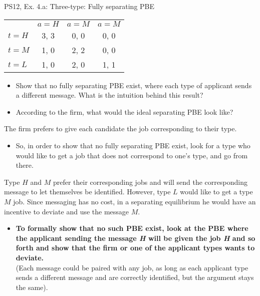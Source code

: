 \begin{frame}{PS12, Ex. 4.a: Three-type: Fully separating PBE}
    \begin{table}
      \begin{tabular}{l|c|c|c|}
          \multicolumn{1}{c}{} & \multicolumn{1}{c}{$a=H$} & \multicolumn{1}{c}{$a=M$} & \multicolumn{1}{c}{$a=M$} \\\cline{2-4}
          $t=H$ & 3, 3 & 0, 0 & 0, 0 \\\cline{2-4}
          $t=M$ & 1, 0 & 2, 2 & 0, 0 \\\cline{2-4}
          $t=L$ & 1, 0 & 2, 0 & 1, 1 \\\cline{2-4}
      \end{tabular}
    \end{table}\vspace{-8pt}
    \begin{itemize}
      \item[(a)] Show that no fully separating PBE exist, where each type of applicant sends a different message. What is the intuition behind this result?
      \item[Step 1:] According to the firm, what would the ideal separating PBE look like?
    \end{itemize}\vspace{-6pt}
    The firm prefers to give each candidate the job corresponding to their type.\vspace{-4pt}
    \begin{itemize}
      \item[Step 2:] So, in order to show that no fully separating PBE exist, look for a type who would like to get a job that does not correspond to one's type, and go from there.
    \end{itemize}\vspace{-6pt}
    Type $H$ and $M$ prefer their corresponding jobs and will send the corresponding message to let themselves be identified. However, type $L$ would like to get a type $M$ job. Since messaging has no cost, in a separating equilibrium he would have an incentive to deviate and use the message $M$.\vspace{-4pt}
    \begin{itemize}
      \item[Step 3:] \textbf{To formally show that no such PBE exist, look at the PBE where the applicant sending the message \textit{H} will be given the job \textit{H} and so forth and show that the firm or one of the applicant types wants to deviate.}\\
      (Each message could be paired with any job, as long as each applicant type sends a different message and are correctly identified, but the argument stays the same).
    \end{itemize}
    \vfill\null
\end{frame}
